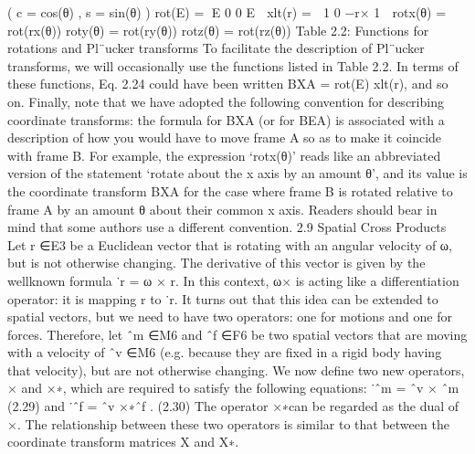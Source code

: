 ( c = cos(θ) , s = sin(θ) ) rot(E) = E 0 0 E  xlt(r) =  1 0 −r× 1  rotx(θ) = rot(rx(θ)) roty(θ) = rot(ry(θ)) rotz(θ) = rot(rz(θ)) Table 2.2: Functions for rotations and Pl¨ucker transforms To facilitate the description of Pl¨ucker transforms, we will occasionally use the functions listed in Table 2.2. In terms of these functions, Eq. 2.24 could have been written BXA = rot(E) xlt(r), and so on. Finally, note that we have adopted the following convention for describing coordinate transforms: the formula for BXA (or for BEA) is associated with a description of how you would have to move frame A so as to make it coincide with frame B. For example, the expression ‘rotx(θ)’ reads like an abbreviated version of the statement ‘rotate about the x axis by an amount θ’, and its value is the coordinate transform BXA for the case where frame B is rotated relative to frame A by an amount θ about their common x axis. Readers should bear in mind that some authors use a different convention. 2.9 Spatial Cross Products Let r ∈E3 be a Euclidean vector that is rotating with an angular velocity of ω, but is not otherwise changing. The derivative of this vector is given by the wellknown formula ˙r = ω × r. In this context, ω× is acting like a differentiation operator: it is mapping r to ˙r. It turns out that this idea can be extended to spatial vectors, but we need to have two operators: one for motions and one for forces. Therefore, let ˆm ∈M6 and ˆf ∈F6 be two spatial vectors that are moving with a velocity of ˆv ∈M6 (e.g. because they are fixed in a rigid body having that velocity), but are not otherwise changing. We now define two new operators, × and ×∗, which are required to satisfy the following equations: ˙ˆm = ˆv × ˆm (2.29) and ˙ˆf = ˆv ×∗ˆf . (2.30) The operator ×∗can be regarded as the dual of ×. The relationship between these two operators is similar to that between the coordinate transform matrices X and X∗.

